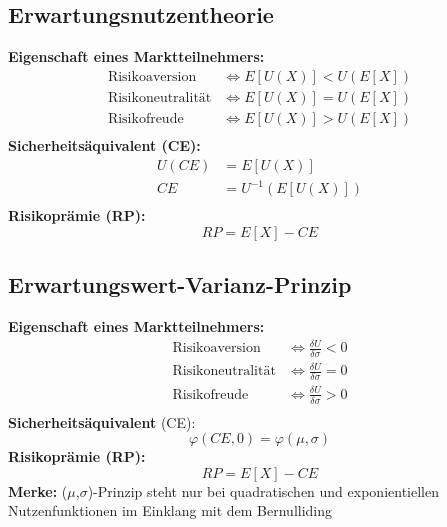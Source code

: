\documentclass[leqno]{scrartcl}
\begin{document}
\begin{multicols}{4}
\subsection{Erwartungsnutzentheorie}

\textbf{Eigenschaft eines Marktteilnehmers:}
  \begin{equation*}
    \begin{split}
      \text{Risikoaversion}    &\Leftrightarrow E[U(X)] < U(E[X]) \\
      \text{Risikoneutralität} &\Leftrightarrow E[U(X)] = U(E[X]) \\
      \text{Risikofreude}      &\Leftrightarrow E[U(X)] > U(E[X]) \\
    \end{split}
  \end{equation*}
\textbf{Sicherheitsäquivalent (CE):}
  \begin{equation*}
    \begin{split}
      U(CE) &= E[U(X)]\\
        CE &= U^{-1}(E[U(X)])\\
    \end{split}
  \end{equation*}
\textbf{Risikoprämie (RP):}
  \begin{equation*}
    RP = E[X] - CE
  \end{equation*}

\subsection{Erwartungswert-Varianz-Prinzip}

\textbf{Eigenschaft eines Marktteilnehmers:}
  \begin{equation*}
    \begin{split}
      \text{Risikoaversion}    &\Leftrightarrow \frac{\delta U}{\delta \sigma} < 0 \\
      \text{Risikoneutralität} &\Leftrightarrow \frac{\delta U}{\delta \sigma} = 0 \\
      \text{Risikofreude}      &\Leftrightarrow \frac{\delta U}{\delta \sigma} > 0 \\
    \end{split}
  \end{equation*}
\textbf{Sicherheitsäquivalent} (CE):
  \begin{equation*}
    \varphi(CE, 0) = \varphi(\mu, \sigma)
  \end{equation*}
\textbf{Risikoprämie (RP):}
  \begin{equation*}
    RP = E[X] - CE
  \end{equation*}
\textbf{Merke:} ($\mu$,$\sigma$)-Prinzip steht nur bei quadratischen und
exponientiellen Nutzenfunktionen im Einklang mit dem Bernulliding


\end{multicols}
\end{document}
